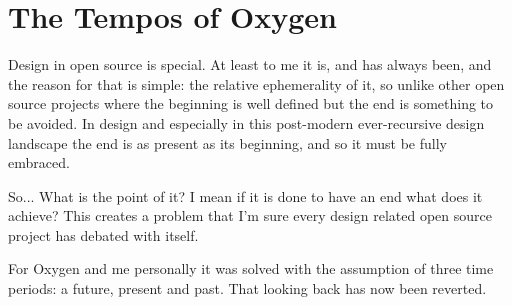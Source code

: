 

\section*{The Tempos of Oxygen}
Design in open source is special. At least to me it is, and has always been, and the reason for that is simple: the relative ephemerality of it, so unlike other open source projects where the beginning is well defined but the end is something to be avoided. In design and especially in this post-modern ever-recursive design landscape the end is as present as its beginning, and so it must be fully embraced.

So... What is the point of it? I mean if it is done to have an end what does it achieve? This creates a problem that I'm sure every design related open source project has debated with itself.

For Oxygen and me personally it was solved with the assumption of three time periods: a future, present and past. That looking back has now been reverted.

